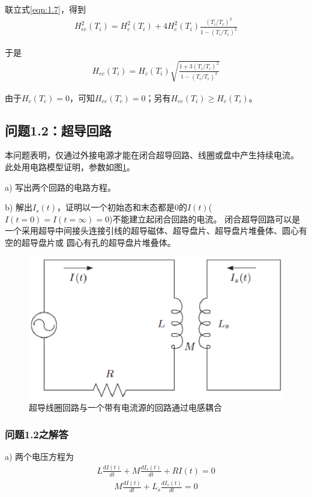 联立式\ref{eqn:1.7}，得到
\begin{align*}
H_{ec}^2(T_i)=H_c^2(T_i)+4H_c^2(T_i)\frac{(T_i/T_c)^2}{1-(T_i/T_c)^2} \tag{S1.24}
\end{align*}

于是
\begin{align*}
H_{ec}(T_i)=H_c(T_i)\sqrt{\frac{1+3(T_i/T_c)^2}{1-(T_i/T_c)^2}}
\end{align*}

由于$H_c(T_c)=0$，可知$H_{ec}(T_c)=0$；另有$H_{ec}(T_i)\ge H_c(T_i)$。


\subsection{问题1.2：超导回路}
本问题表明，仅通过外接电源才能在闭合超导回路、线圈或盘中产生持续电流。
此处用电路模型证明，参数如图\ref{scloop}。
 
a) 写出两个回路的电路方程。

b) 解出$I_s(t)$，证明以一个初始态和末态都是0的$I(t)$($I(t=0)=I(t=\infty)=0$)不能建立起闭合回路的电流。
闭合超导回路可以是一个采用超导中间接头连接引线的超导磁体、超导盘片、超导盘片堆叠体、圆心有空的超导盘片或
圆心有孔的超导盘片堆叠体。

\begin{figure}[htbp]
  \centering
 \includegraphics[scale=0.6]{chpt1/figs/fig1.8.eps}
  \caption{
超导线圈回路与一个带有电流源的回路通过电感耦合
}\label{scloop}
\end{figure}

\subsubsection{问题1.2之解答}
a) 两个电压方程为
\begin{align*}
L\frac{dI(t)}{dt}+M\frac{dI_s(t)}{dt}+ RI(t) = 0 \tag{S2.1a}
\end{align*}
\begin{align*}
M\frac{dI(t)}{dt}+ L_s\frac{dI_s(t)}{dt}= 0 \tag{S2.1b}
\end{align*}

